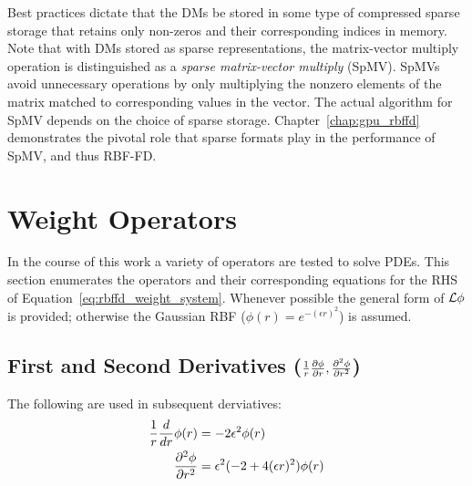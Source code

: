 \documentclass[11pt]{report}
\begin{document}
{Best practices dictate that the DMs be stored in some type of compressed sparse storage that retains only non-zeros and their corresponding indices in memory. Note that with DMs stored as sparse representations, the matrix-vector multiply operation is distinguished as a \emph{sparse matrix-vector multiply} (SpMV). SpMVs avoid unnecessary operations by only multiplying the nonzero elements of the matrix matched to corresponding values in the vector. The actual algorithm for SpMV depends on the choice of sparse storage. Chapter~\ref{chap:gpu_rbffd} demonstrates the pivotal role that sparse formats play in the performance of SpMV, and thus RBF-FD. 



\section{Weight Operators}
\label{sec:weight_operators}
In the course of this work a variety of operators are tested to solve PDEs. This section enumerates the operators and their corresponding equations for the RHS of Equation~\ref{eq:rbffd_weight_system}. Whenever possible the general form of $\mathcal{L}\phi$ is provided; otherwise the Gaussian RBF ($\phi(r) = e^{-(\epsilon r)^2}$) is assumed. 


\subsection{First and Second Derivatives ($\frac{1}{r}\frac{\partial \phi}{\partial r}, \frac{\partial^2 \phi}{\partial r^2}$)}
The following are used in subsequent derviatives:
\begin{align}
\frac{1}{r}\frac{d }{d r}\phi(r) & = -2 \epsilon^2 \phi(r) \label{eq:dphi_dr} \\
\frac{\partial^2 \phi}{\partial r^2} & = \epsilon^2(-2 + 4(\epsilon r)^2)\phi(r)
\end{align}



}
\end{document}
